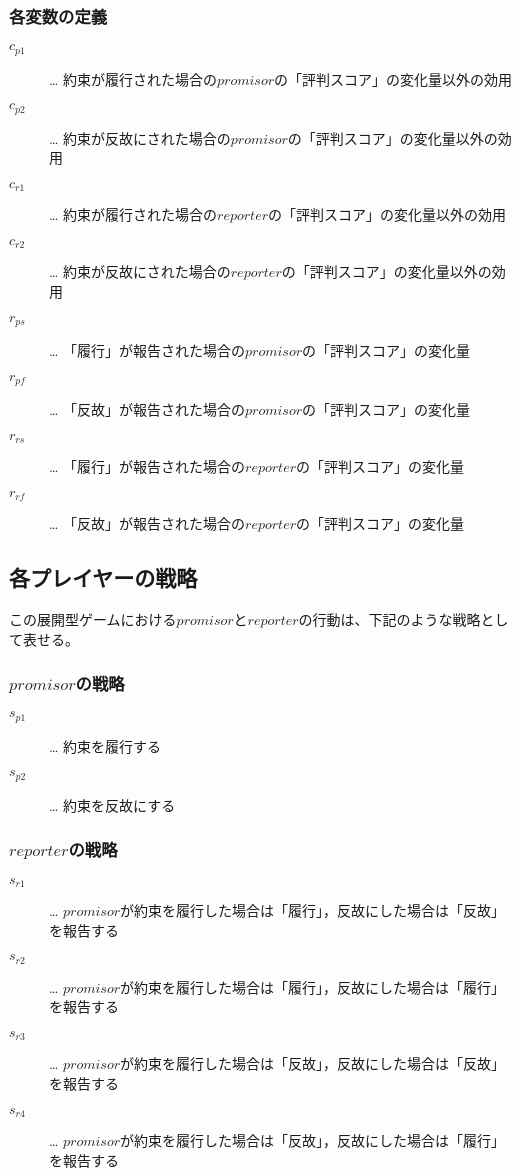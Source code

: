 \subsubsection{各変数の定義}
\label{prgamePayoffVariables}
\begin{description}
  \item[$c_{p1}$]… 約束が履行された場合の$promisor$の「評判スコア」の変化量以外の効用
  \item[$c_{p2}$]… 約束が反故にされた場合の$promisor$の「評判スコア」の変化量以外の効用
  \item[$c_{r1}$]… 約束が履行された場合の$reporter$の「評判スコア」の変化量以外の効用
  \item[$c_{r2}$]… 約束が反故にされた場合の$reporter$の「評判スコア」の変化量以外の効用
  \item[$r_{ps}$]… 「履行」が報告された場合の$promisor$の「評判スコア」の変化量
  \item[$r_{pf}$]… 「反故」が報告された場合の$promisor$の「評判スコア」の変化量
  \item[$r_{rs}$]… 「履行」が報告された場合の$reporter$の「評判スコア」の変化量
  \item[$r_{rf}$]… 「反故」が報告された場合の$reporter$の「評判スコア」の変化量
\end{description}



\subsection{各プレイヤーの戦略}
\label{playersStrategy}
この展開型ゲームにおける$promisor$と$reporter$の行動は、下記のような戦略として表せる。

\subsubsection{$promisor$の戦略}
\begin{description}
  \item[$s_{p1}$]… 約束を履行する
  \item[$s_{p2}$]… 約束を反故にする
\end{description}

\subsubsection{$reporter$の戦略}
\begin{description}
  \item[$s_{r1}$]… $promisor$が約束を履行した場合は「履行」，反故にした場合は「反故」を報告する
  \item[$s_{r2}$]… $promisor$が約束を履行した場合は「履行」，反故にした場合は「履行」を報告する
  \item[$s_{r3}$]… $promisor$が約束を履行した場合は「反故」，反故にした場合は「反故」を報告する
  \item[$s_{r4}$]… $promisor$が約束を履行した場合は「反故」，反故にした場合は「履行」を報告する
\end{description}

